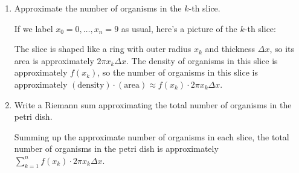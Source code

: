 \documentclass{article}
\begin{document}
\begin{enumerate}
\begin{enumerate}
\begin{enumerate}
    \item
      \begin{problem}[\vfill]
        Approximate the number of organisms in the $k$-th slice.
      \end{problem}

      \begin{solution}
        If we label $x_0 = 0, \ldots, x_n = 9$ as usual, here's a picture
        of the $k$-th slice:
        \begin{center}
        \end{center}
        The slice is shaped like a ring with outer radius $x_k$ and
        thickness $\Delta x$, so its area is approximately $2 \pi x_k
        \Delta x$.  The density of organisms in this slice is
        approximately $f(x_k)$, so the number of organisms in this slice
        is approximately $(\text{density}) \cdot (\text{area}) \approx
        \boxed{f(x_k) \cdot 2 \pi x_k \Delta x}$.
      \end{solution}

    \item
      \begin{problem}[\vfill]
        Write a Riemann sum approximating the total number of organisms in
        the petri dish.
      \end{problem}

      \begin{solution}
        Summing up the approximate number of organisms in each slice, the
        total number of organisms in the petri dish is approximately
        $\boxed{\sum_{k=1}^n f(x_k) \cdot 2 \pi x_k \Delta x}$. 
      \end{solution}


\end{enumerate}
\end{enumerate}
\end{enumerate}
\end{document}
